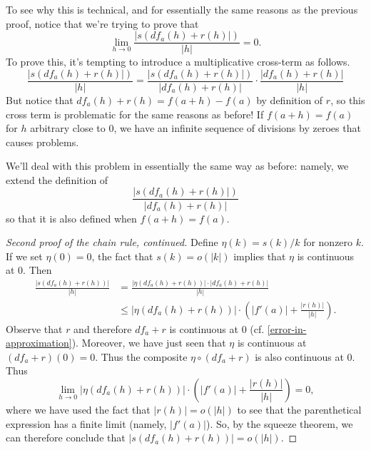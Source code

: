 To see why this is technical, and for essentially the same reasons as the previous proof, notice that we're trying to prove that
\[ \lim_{h \to 0} \frac{|s(df_a(h)+r(h)|)}{|h|} = 0.  \]
To prove this, it's tempting to introduce a multiplicative cross-term as follows. 
\[ \frac{|s(df_a(h)+r(h)|)}{|h|} = \frac{|s(df_a(h)+r(h)|)}{|df_a(h)+r(h)|} \cdot \frac{|df_a(h)+r(h)|}{|h|} \]
But notice that $df_a(h)+r(h) = f(a+h)-f(a)$ by definition of $r$, so this cross term is problematic for the same reasons as before! If $f(a+h) = f(a)$ for $h$ arbitrary close to $0$, we have an infinite sequence of divisions by zeroes that causes problems. 

We'll deal with this problem in essentially the same way as before: namely, we extend the definition of 
\[\frac{|s(df_a(h)+r(h)|)}{|df_a(h)+r(h)|}\]
so that it is also defined when $f(a+h) = f(a)$. 

\begin{proof}[Second proof of the chain rule, continued]
	Define $\eta(k) = s(k)/k$ for nonzero $k$. If we set $\eta(0) = 0$, the fact that $s(k) = o(|k|)$ implies that $\eta$ is continuous at 0. Then 
	\[ \begin{aligned} \frac{|s(df_a(h)+r(h))|}{|h|} &= \frac{|\eta(df_a(h)+r(h))| \cdot |df_a(h)+r(h)|}{|h|} \\
	&\leq |\eta(df_a(h)+r(h))| \cdot \left( |f'(a)| + \frac{|r(h)|}{|h|} \right). \end{aligned} \]
	Observe that $r$ and therefore $df_a + r$ is continuous at $0$ (cf. \cref{error-in-approximation}). Moreover, we have just seen that $\eta$ is continuous at $(df_a + r)(0) = 0$. Thus the composite $\eta \circ (df_a + r)$ is also continuous at 0. Thus
	\[ \lim_{h \to 0} |\eta(df_a(h)+r(h))| \cdot \left( |f'(a)| + \frac{|r(h)|}{|h|} \right) = 0, \]
	where we have used the fact that $|r(h)| = o(|h|)$ to see that the parenthetical expression has a finite limit (namely, $|f'(a)|$). So, by the squeeze theorem, we can therefore conclude that $|s(df_a(h)+r(h))| = o(|h|)$.  
\end{proof}

